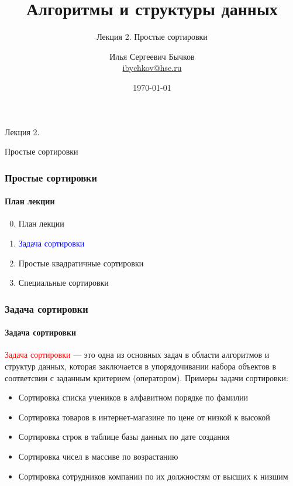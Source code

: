 \documentclass[aspectratio=169]{beamer}
\title[Title]{Алгоритмы и структуры данных}
\subtitle{Лекция 2. Простые сортировки}
\author[Author's name]{Илья Сергеевич Бычков\\ \smallskip \scriptsize \url{ibychkov@hse.ru}}
\institute{НИУ ВШЭ - Нижний Новгород}
\date{\today}
\begin{document}
\frame[plain]{\titlepage}

\begin{frame}[c]

\begin{center}
\Huge Лекция 2.

\Huge Простые сортировки
\end{center}

\end{frame}

\begin{frame}
\frametitle{Простые сортировки}
\framesubtitle{План лекции}

\begin{enumerate}
  \setcounter{enumi}{-1}
  \item{План лекции}
  \item{\textcolor{blue}{Задача сортировки}}
  \item{Простые квадратичные сортировки}
  \item{Специальные сортировки}
\end{enumerate}
\end{frame}



\begin{frame}
\frametitle{Задача сортировки}
\framesubtitle{Задача сортировки}
\justifying
\textcolor{red}{Задача сортировки} — это одна из основных задач в области алгоритмов и структур данных, которая заключается в упорядочивании набора объектов в соответсвии с заданным критерием (оператором).\newline\newline
Примеры задачи сортировки:
\begin{itemize}
\item{Сортировка списка учеников в алфавитном порядке по фамилии}
\item{Сортировка товаров в интернет-магазине по цене от низкой к высокой}
\item{Сортировка строк в таблице базы данных по дате создания}
\item{Сортировка чисел в массиве по возрастанию}
\item{Сортировка сотрудников компании по их должностям от высших к низшим}
\end{itemize}
\end{frame}
\end{document}
